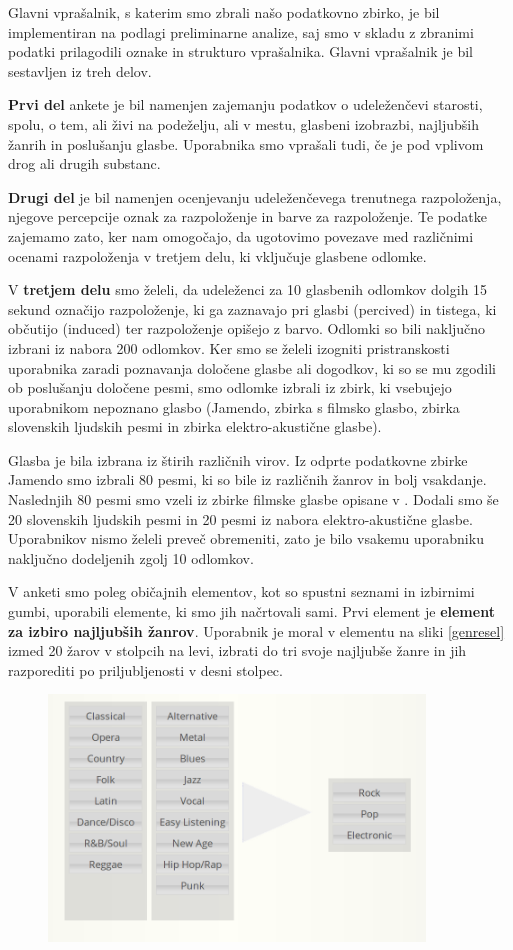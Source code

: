 \documentclass[a4paper, 12pt]{book}
\begin{document}
{Glavni vprašalnik, s katerim smo zbrali našo podatkovno zbirko, je bil implementiran na podlagi preliminarne analize, saj smo v skladu z zbranimi podatki prilagodili oznake in strukturo vprašalnika. Glavni vprašalnik je bil sestavljen iz treh delov.


\textbf{Prvi del} ankete je bil namenjen zajemanju podatkov o  udeleženčevi starosti, spolu, o tem, ali živi na podeželju, ali v mestu, glasbeni izobrazbi, najljubših žanrih in poslušanju glasbe. Uporabnika smo vprašali tudi, če je pod vplivom drog ali drugih substanc.  

\textbf{Drugi del} je bil namenjen ocenjevanju udeleženčevega trenutnega razpoloženja, njegove percepcije oznak za razpoloženje in barve za razpoloženje. Te podatke zajemamo zato, ker nam omogočajo, da ugotovimo povezave med različnimi ocenami razpoloženja v tretjem delu, ki vključuje glasbene odlomke.

V \textbf{tretjem delu} smo želeli, da udeleženci za 10 glasbenih odlomkov dolgih 15 sekund označijo razpoloženje, ki ga zaznavajo pri glasbi (percived) in tistega, ki občutijo (induced) ter razpoloženje opišejo z barvo. Odlomki so bili naključno izbrani iz nabora 200 odlomkov. Ker smo se želeli izogniti pristranskosti uporabnika zaradi poznavanja določene glasbe ali dogodkov, ki so se mu zgodili ob poslušanju določene pesmi, smo odlomke izbrali iz zbirk, ki vsebujejo uporabnikom nepoznano glasbo (Jamendo, zbirka s filmsko glasbo, zbirka slovenskih ljudskih pesmi in zbirka elektro-akustične glasbe).  

Glasba je bila izbrana iz štirih različnih virov. Iz odprte podatkovne zbirke Jamendo smo izbrali 80 pesmi, ki so bile iz različnih žanrov in bolj vsakdanje. Naslednjih 80 pesmi smo vzeli iz zbirke filmske glasbe opisane v \cite{Eerola2010}. Dodali smo še 20 slovenskih ljudskih pesmi in 20 pesmi iz nabora elektro-akustične glasbe. Uporabnikov nismo želeli preveč obremeniti, zato je bilo vsakemu uporabniku naključno dodeljenih zgolj 10 odlomkov.

V anketi smo poleg običajnih elementov, kot so spustni seznami in izbirnimi gumbi, uporabili elemente, ki smo jih načrtovali sami. Prvi element je \textbf{element za izbiro najljubših žanrov}.  Uporabnik je moral v elementu na sliki \ref{genresel} izmed 20 žarov v stolpcih na levi, izbrati do tri svoje najljubše žanre in jih razporediti po priljubljenosti v desni stolpec.

\begin{figure}[h!t]
\centering
\includegraphics[width=10cm]{genresel.png}


\end{figure}}
\end{document}
